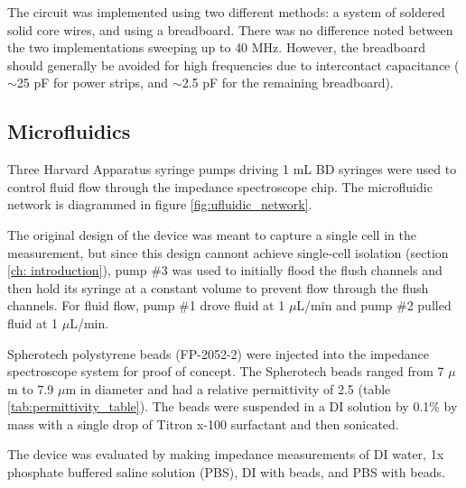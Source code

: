 \par The circuit was implemented using two different methods: a system of soldered solid core wires, and using a breadboard. There was no difference noted between the two implementations sweeping up to 40 MHz. However, the breadboard should generally be avoided for high frequencies due to intercontact capacitance ($\sim$25 pF for power strips, and $\sim$2.5 pF for the remaining breadboard).


\subsection{Microfluidics}

\par Three Harvard Apparatus syringe pumps driving 1 mL BD syringes were used to control fluid flow through the impedance spectroscope chip. The microfluidic network is diagrammed in figure \ref{fig:ufluidic_network}.

\par The original design of the device was meant to capture a single cell in the measurement, but since this design cannont achieve single-cell isolation (section \ref{ch: introduction}), pump \#3 was used to initially flood the flush channels and then hold its syringe at a constant volume to prevent flow through the flush channels. For fluid flow, pump \#1 drove fluid at 1 $\mu$L/min and pump \#2 pulled fluid at 1 $\mu$L/min. 


\par Spherotech polystyrene beads (FP-2052-2) were injected into the impedance spectroscope system for proof of concept. The Spherotech beads ranged from 7 $\mu$m to 7.9 $\mu$m in diameter and had a relative permittivity of 2.5 (table \ref{tab:permittivity_table}). The beads were suspended in a DI solution by 0.1\% by mass with a single drop of Titron x-100 surfactant and then sonicated.

\par The device was evaluated by making impedance measurements of DI water, 1x phosphate buffered saline solution (PBS), DI with beads, and PBS with beads. 

